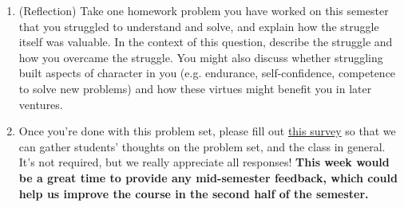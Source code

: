 \documentclass[11pt]{article}
\begin{document}
\begin{enumerate}
\begin{enumerate}
  \item Suppose that there is an algorithm
 running in time $T(n,m)\geq n+m$ that solves \IndependentSetThresholdDecision.   Prove that there is an algorithm running in time $O(n\cdot T(n,m))$ that solves \IndependentSetThresholdSearch.
(Hint: Show that $G$ has an independent set of size at least $k$ containing vertex $v$ iff $G-N(v)$ has an independent set of size at least $k-1$, where $G-N(v)$ denotes the graph obtained by removing $v$ and all of its neighbors from $G$.  Use this fact and the oracle to determine for each vertex $v$, whether or not to include $v$ in the independent set.  Remember to update the graph appropriately after each decision.) Be sure to both prove correctness and analyze runtime for the algorithm you provide.

\end{enumerate}
 We remark (but you don't need to submit anything) that the combination of the three previous problem parts means that for every constant $c\in [1,2]$, if there is an algorithm solving any one of the three problems in time $(n+m)^{O(1)}\cdot c^n$, there are algorithms solving the other two problems in $(n+m)^{O(1)}\cdot c^n$ time.  The best known algorithm (by Xiao and Nagamochi, 2013) has $c \approx 1.1996$.

\item (Reflection) Take one homework problem you have worked on this semester that you struggled to understand and solve, and explain how the struggle itself was valuable.  In the context of this question, describe the struggle and how you overcame the struggle. You might also discuss whether struggling built aspects of character in you (e.g. endurance, self-confidence, competence to solve new problems) and how these virtues might benefit you in later ventures.

\item Once you're done with this problem set, please fill out \href{https://forms.gle/5CwFJoH9jcxGMGkp6}{this survey} so that we can gather students' thoughts on the problem set, and the class in general. It's not required, but we really appreciate all responses! \textbf{This week would be a great time to provide any mid-semester feedback, which could help us improve the course in the second half of the semester.}

\end{enumerate}
\end{document}
